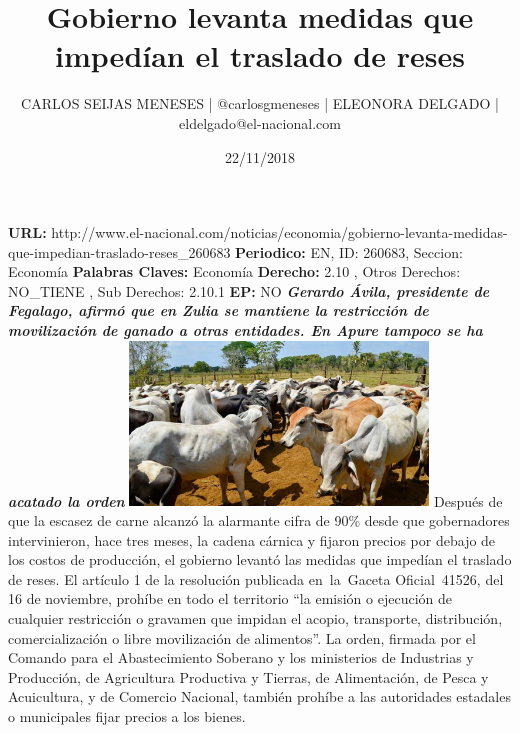 \documentclass{article}%
\title{\textbf{Gobierno levanta medidas que impedían el traslado de reses}}%
\author{CARLOS SEIJAS MENESES | @carlosgmeneses | ELEONORA DELGADO | eldelgado@el{-}nacional.com}%
\date{22/11/2018}%
\begin{document}
%
\normalsize%
\maketitle%
\textbf{URL: }%
http://www.el{-}nacional.com/noticias/economia/gobierno{-}levanta{-}medidas{-}que{-}impedian{-}traslado{-}reses\_260683\newline%
%
\textbf{Periodico: }%
EN, %
ID: %
260683, %
Seccion: %
Economía\newline%
%
\textbf{Palabras Claves: }%
Economía\newline%
%
\textbf{Derecho: }%
2.10%
, Otros Derechos: %
NO\_TIENE%
, Sub Derechos: %
2.10.1%
\newline%
%
\textbf{EP: }%
NO\newline%
\newline%
%
\textbf{\textit{Gerardo Ávila, presidente de Fegalago, afirmó que en Zulia se mantiene la restricción de movilización de ganado a otras entidades. En Apure tampoco se ha acatado la orden}}%
\newline%
\newline%
%
\includegraphics[width=300px]{216.jpg}%
\newline%
%
Después de que la escasez de carne alcanzó la alarmante cifra de 90\% desde que gobernadores intervinieron, hace tres meses, la cadena cárnica y fijaron precios por debajo de los costos de producción, el gobierno levantó las medidas que impedían el traslado de reses.%
\newline%
%
El artículo 1 de la resolución publicada en~la~Gaceta Oficial~41526, del 16 de noviembre, prohíbe en todo el territorio “la emisión o ejecución de cualquier restricción o gravamen que impidan el acopio, transporte, distribución, comercialización o libre movilización de alimentos”.%
\newline%
%
La orden, firmada por el Comando para el Abastecimiento Soberano y los ministerios de Industrias y Producción, de Agricultura Productiva y Tierras, de Alimentación, de Pesca y Acuicultura, y de Comercio Nacional, también prohíbe a las autoridades estadales o municipales fijar precios a los bienes.%
\end{document}
